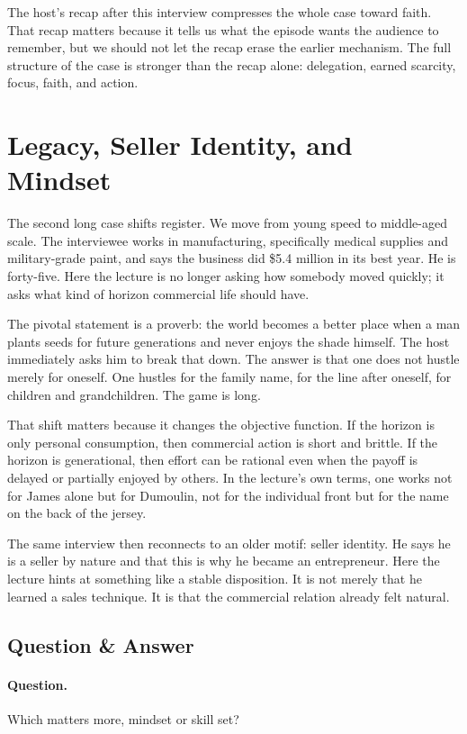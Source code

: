 The host's recap after this interview compresses the whole case toward faith. That recap matters because it tells us what the episode wants the audience to remember, but we should not let the recap erase the earlier mechanism. The full structure of the case is stronger than the recap alone: delegation, earned scarcity, focus, faith, and action.

\section{Legacy, Seller Identity, and Mindset}

The second long case shifts register. We move from young speed to middle-aged scale. The interviewee works in manufacturing, specifically medical supplies and military-grade paint, and says the business did \$5.4 million in its best year. He is forty-five. Here the lecture is no longer asking how somebody moved quickly; it asks what kind of horizon commercial life should have.

The pivotal statement is a proverb: the world becomes a better place when a man plants seeds for future generations and never enjoys the shade himself. The host immediately asks him to break that down. The answer is that one does not hustle merely for oneself. One hustles for the family name, for the line after oneself, for children and grandchildren. The game is long.

That shift matters because it changes the objective function. If the horizon is only personal consumption, then commercial action is short and brittle. If the horizon is generational, then effort can be rational even when the payoff is delayed or partially enjoyed by others. In the lecture's own terms, one works not for James alone but for Dumoulin, not for the individual front but for the name on the back of the jersey.

The same interview then reconnects to an older motif: seller identity. He says he is a seller by nature and that this is why he became an entrepreneur. Here the lecture hints at something like a stable disposition. It is not merely that he learned a sales technique. It is that the commercial relation already felt natural.

\subsection{Question \& Answer}

\paragraph{Question.} Which matters more, mindset or skill set?

